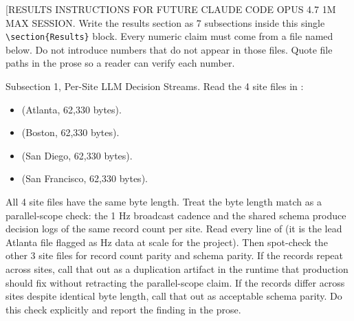 %
%

\begin{sectionaccent}

[RESULTS INSTRUCTIONS FOR FUTURE CLAUDE CODE OPUS 4.7 1M MAX SESSION.
Write the results section as 7 subsections inside this single
\texttt{\textbackslash section\{Results\}} block. Every numeric claim must
come from a file named below. Do not introduce numbers that do not
appear in those files. Quote file paths in the prose so a reader can
verify each number.

Subsection 1, Per-Site LLM Decision Streams. Read the 4 site files in
:
\begin{itemize}
  \item {} (Atlanta, 62,330 bytes).
  \item {} (Boston, 62,330 bytes).
  \item {} (San Diego, 62,330 bytes).
  \item {} (San Francisco,
        62,330 bytes).
\end{itemize}
All 4 site files have the same byte length. Treat the byte length
match as a parallel-scope check: the 1 Hz broadcast cadence and the
shared schema produce decision logs of the same record count per
site. Read every line of  (it is
the lead Atlanta file flagged as Hz data at scale for the project).
Then spot-check the other 3 site files for record count parity and
schema parity. If the records repeat across sites, call that out as a
duplication artifact in the runtime that production should fix
without retracting the parallel-scope claim. If the records differ
across sites despite identical byte length, call that out as
acceptable schema parity. Do this check explicitly and report the
finding in the prose.


\end{sectionaccent}
